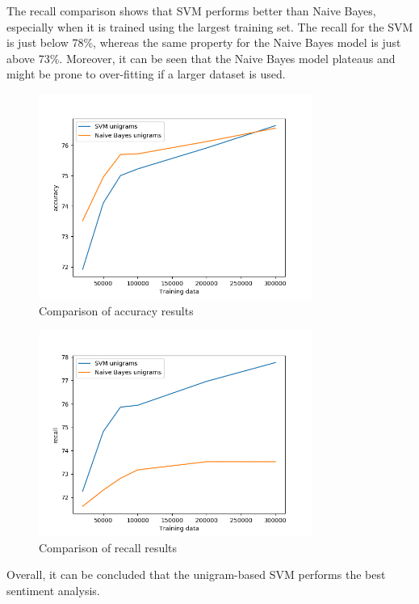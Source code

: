The recall comparison shows that SVM performs better than Naive Bayes, especially when it is trained using the largest training set. The recall for the SVM is just below 78\%, whereas the same property for the Naive Bayes model is just above 73\%. Moreover, it can be seen that the Naive Bayes model plateaus and might be prone to over-fitting if a larger dataset is used.

\begin{figure}[ht]
    \centering
    \includegraphics[width=0.8\textwidth]{classACCComp}
    \caption{Comparison of accuracy results}
    \label{fig:acccomp}
\end{figure}

\begin{figure}[ht]
    \centering
    \includegraphics[width=0.8\textwidth]{classRECComp}
    \caption{Comparison of recall results}
    \label{fig:reccomp}
\end{figure}

Overall, it can be concluded that the unigram-based SVM performs the best sentiment analysis. 

